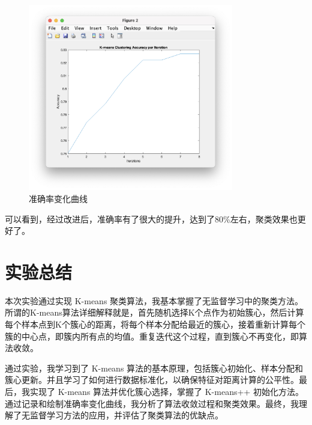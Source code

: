 \documentclass[12pt,a4paper,oneside]{article}
\begin{document}
\begin{figure}[H]
    \centering
    \includegraphics[width=0.8\textwidth]{image/2}
    \caption{准确率变化曲线}
\end{figure}

\qquad 可以看到，经过改进后，准确率有了很大的提升，达到了80\%左右，聚类效果也更好了。

\section{实验总结}
\qquad 本次实验通过实现 K-means 聚类算法，我基本掌握了无监督学习中的聚类方法。所谓的K-means算法详细解释就是，首先随机选择K个点作为初始簇心，然后计算每个样本点到K个簇心的距离，将每个样本分配给最近的簇心，接着重新计算每个簇的中心点，即簇内所有点的均值。重复迭代这个过程，直到簇心不再变化，即算法收敛。

\qquad 通过实验，我学习到了 K-means 算法的基本原理，包括簇心初始化、样本分配和簇心更新。并且学习了如何进行数据标准化，以确保特征对距离计算的公平性。最后，我实现了 K-means 算法并优化簇心选择，掌握了 K-means++ 初始化方法。通过记录和绘制准确率变化曲线，我分析了算法收敛过程和聚类效果。最终，我理解了无监督学习方法的应用，并评估了聚类算法的优缺点。
\end{document}
